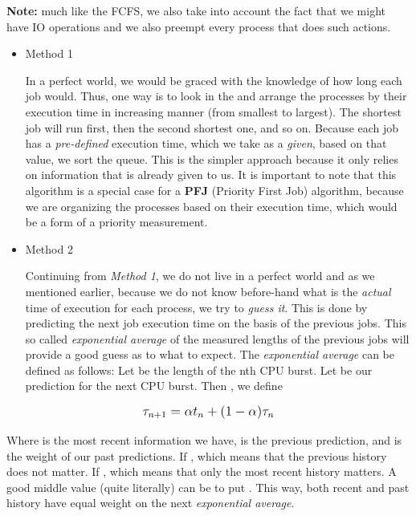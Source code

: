\documentclass{article}
\newcommand{\code}[1]{\codeinline{\texttt{#1}}}
\begin{document}
\textbf{Note:} much like the FCFS, we also take into account the fact that we might have IO operations and we also preempt every process that does such actions.


\begin{itemize}
\item Method 1

In a perfect world, we would be graced with the knowledge of how long each job would. Thus, one way is to look in the \code{ready\_queue} and arrange the processes by their execution time in increasing manner (from smallest to largest). The shortest job will run first, then the second shortest one, and so on. Because each job has a \textit{pre-defined} execution time, which we take as a \textit{given}, based on that value, we sort the queue. This is the simpler approach because it only relies on information that is already given to us. It is important to note that this algorithm is a special case for a \textbf{PFJ} (Priority First Job) algorithm, because we are organizing the processes based on their execution time, which would be a form of a priority measurement.

\item Method 2

Continuing from \textit{Method 1}, we do not live in a perfect world and as we mentioned earlier, because we do not know before-hand what is the \textit{actual} time of execution for each process, we try to \textit{guess it}. This is done by predicting the next job execution time on the basis of the previous jobs. This so called \textit{exponential average} of the measured lengths of the previous jobs will provide a good guess as to what to expect. The \textit{exponential average} can be defined as follows: Let  be the length of the nth CPU burst. Let  be our prediction for the next CPU burst. Then , we define
\end{itemize}

\begin{equation}
  \mathlarger{\tau_{n+1} = \alpha t_{n} + (1 - \alpha)\tau_{n}}
\end{equation}

Where  is the most recent information we have,  is the previous prediction, and \scalebox{1.1}{\(\alpha\)} is the weight of our past predictions. If , which means that the previous history does not matter. If , which means that only the most recent history matters. A good middle value (quite literally) can be to put . This way, both recent and past history have equal weight on the next \textit{exponential average}.
\end{document}
